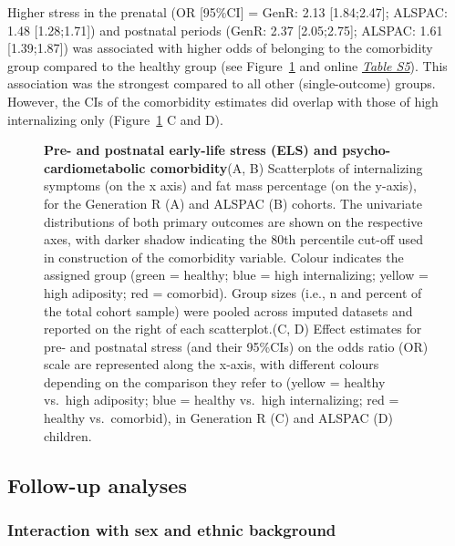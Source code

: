 \documentclass[
  letterpaper,
  DIV=11,
  numbers=noendperiod]{scrreport}
\begin{document}
Higher stress in the prenatal (OR {[}95\%CI{]} = GenR: 2.13
{[}1.84;2.47{]}; ALSPAC: 1.48 {[}1.28;1.71{]}) and postnatal periods
(GenR: 2.37 {[}2.05;2.75{]}; ALSPAC: 1.61 {[}1.39;1.87{]}) was
associated with higher odds of belonging to the comorbidity group
compared to the healthy group (see Figure~\ref{fig-2.4} and online
\href{https://osf.io/7e4x8}{\emph{Table S5}}). This association was the
strongest compared to all other (single-outcome) groups. However, the
CIs of the comorbidity estimates did overlap with those of high
internalizing only (Figure~\ref{fig-2.4} C and D).

\begin{figure}[H]


\caption{\label{fig-2.4}\textbf{Pre- and postnatal early-life stress
(ELS) and psycho-cardiometabolic comorbidity}\newline(A, B) Scatterplots
of internalizing symptoms (on the x axis) and fat mass percentage (on
the y-axis), for the Generation R (A) and ALSPAC (B) cohorts. The
univariate distributions of both primary outcomes are shown on the
respective axes, with darker shadow indicating the 80th percentile
cut-off used in construction of the comorbidity variable. Colour
indicates the assigned group (green = healthy; blue = high
internalizing; yellow = high adiposity; red = comorbid). Group sizes
(i.e., n and percent of the total cohort sample) were pooled across
imputed datasets and reported on the right of each
scatterplot.\newline(C, D) Effect estimates for pre- and postnatal
stress (and their 95\%CIs) on the odds ratio (OR) scale are represented
along the x-axis, with different colours depending on the comparison
they refer to (yellow = healthy vs.~high adiposity; blue = healthy
vs.~high internalizing; red = healthy vs.~comorbid), in Generation R (C)
and ALSPAC (D) children.}

\end{figure}%

\subsection{Follow-up analyses}\label{follow-up-analyses}

\subsubsection{Interaction with sex and ethnic
background}\label{interaction-with-sex-and-ethnic-background}
\end{document}

